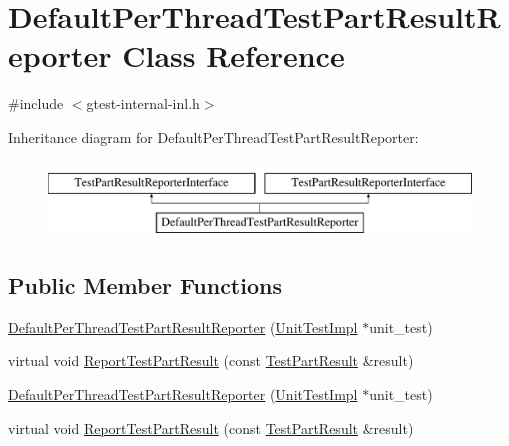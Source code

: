 \hypertarget{classtesting_1_1internal_1_1DefaultPerThreadTestPartResultReporter}{\section{\-Default\-Per\-Thread\-Test\-Part\-Result\-Reporter \-Class \-Reference}
\label{d6/d16/classtesting_1_1internal_1_1DefaultPerThreadTestPartResultReporter}
}


{\ttfamily \#include $<$gtest-\/internal-\/inl.\-h$>$}

\-Inheritance diagram for \-Default\-Per\-Thread\-Test\-Part\-Result\-Reporter\-:\begin{figure}[H]
\begin{center}
\leavevmode
\includegraphics[height=2.000000cm]{d6/d16/classtesting_1_1internal_1_1DefaultPerThreadTestPartResultReporter}
\end{center}
\end{figure}
\subsection*{\-Public \-Member \-Functions}
\begin{DoxyCompactItemize}
\item 
\hyperlink{classtesting_1_1internal_1_1DefaultPerThreadTestPartResultReporter_a49af24a9082840cd2f2880a83f51e540}{\-Default\-Per\-Thread\-Test\-Part\-Result\-Reporter} (\hyperlink{classtesting_1_1internal_1_1UnitTestImpl}{\-Unit\-Test\-Impl} $\ast$unit\-\_\-test)
\item 
virtual void \hyperlink{classtesting_1_1internal_1_1DefaultPerThreadTestPartResultReporter_acd54d55b39f168c91b6370be62cef448}{\-Report\-Test\-Part\-Result} (const \hyperlink{classtesting_1_1TestPartResult}{\-Test\-Part\-Result} \&result)
\item 
\hyperlink{classtesting_1_1internal_1_1DefaultPerThreadTestPartResultReporter_a49af24a9082840cd2f2880a83f51e540}{\-Default\-Per\-Thread\-Test\-Part\-Result\-Reporter} (\hyperlink{classtesting_1_1internal_1_1UnitTestImpl}{\-Unit\-Test\-Impl} $\ast$unit\-\_\-test)
\item 
virtual void \hyperlink{classtesting_1_1internal_1_1DefaultPerThreadTestPartResultReporter_a8662b990bc0a42bbe9fba3cded22d79e}{\-Report\-Test\-Part\-Result} (const \hyperlink{classtesting_1_1TestPartResult}{\-Test\-Part\-Result} \&result)
\end{DoxyCompactItemize}
